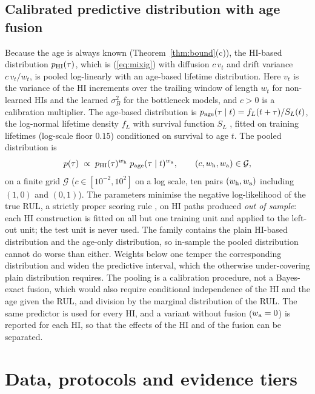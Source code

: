 \documentclass[preprint,12pt]{elsarticle}
\theoremstyle{definition}
\begin{document}
\subsection{Calibrated predictive distribution with age fusion}
\label{sec:fusion}
Because the age is always known (Theorem~\ref{thm:bound}(c)), the HI-based distribution $p_{\rm HI}(\tau)$, which is (\ref{eq:mixig}) with diffusion $c\,v_t$ and drift variance $c\,v_t/w_t$, is pooled log-linearly \cite{genest1986,hinton2002} with an age-based lifetime distribution. Here $v_t$ is the variance of the HI increments over the trailing window of length $w_t$ for non-learned HIs and the learned $\sigma_B^2$ for the bottleneck models, and $c>0$ is a calibration multiplier. The age-based distribution is $p_{\rm age}(\tau\mid t)=f_L(t+\tau)/S_L(t)$, the log-normal lifetime density $f_L$ with survival function $S_L$ \cite{meeker1998}, fitted on training lifetimes (log-scale floor $0.15$) conditioned on survival to age $t$. The pooled distribution is
\begin{equation}
p(\tau)\;\propto\;p_{\rm HI}(\tau)^{w_{\rm h}}\;p_{\rm age}(\tau\mid t)^{w_{\rm a}},\qquad (c,w_{\rm h},w_{\rm a})\in\mathcal G,
\end{equation}
on a finite grid $\mathcal G$ ($c\in[10^{-2},10^{2}]$ on a log scale, ten pairs $(w_{\rm h},w_{\rm a})$ including $(1,0)$ and $(0,1)$). The parameters minimise the negative log-likelihood of the true RUL, a strictly proper scoring rule \cite{gneiting2007}, on HI paths produced \emph{out of sample}: each HI construction is fitted on all but one training unit and applied to the left-out unit; the test unit is never used. The family contains the plain HI-based distribution and the age-only distribution, so in-sample the pooled distribution cannot do worse than either. Weights below one temper the corresponding distribution and widen the predictive interval, which the otherwise under-covering plain distribution requires. The pooling is a calibration procedure, not a Bayes-exact fusion, which would also require conditional independence of the HI and the age given the RUL, and division by the marginal distribution of the RUL. The same predictor is used for every HI, and a variant without fusion ($w_{\rm a}=0$) is reported for each HI, so that the effects of the HI and of the fusion can be separated.

\section{Data, protocols and evidence tiers}
\label{app:data}
\end{document}
